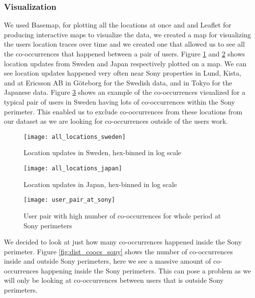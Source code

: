\subsubsection{Visualization}
We used Basemap\cite{basemap}, for plotting all the locations at once and and Leaflet\cite{leaflet} for producing interactive maps to visualize the data, we created a map for visualizing the users location traces over time and we created one that allowed us to see all the co-occurrences that happened between a pair of users. Figure \ref{fig:sweden_locations_hexbin} and \ref{fig:japan_locations_hexbin} shows location updates from Sweden and Japan respectively plotted on a map. We can see location updates happened very often near Sony properties in Lund\cite{sony_headquarters_sweden_lund}, Kista\cite{sony_headquarters_sweden_kista}, and at Ericsson AB in Göteborg\cite{ericsson} for the Swedish data, and in Tokyo\cite{sony_headquarters_japan} for the Japanese data. Figure \ref{fig:user_pair_at_sony} shows an example of the co-occurrences visualized for a typical pair of users in Sweden having lots of co-occurrences within the Sony perimeter. This enabled us to exclude co-occurrences from these locations from our dataset as we are looking for co-occurrences outside of the users work.
\begin{figure}[H]
    \hspace*{-1.0cm}
    \centering
    \texttt{[image: all\_locations\_sweden]}
    \caption{Location updates in Sweden, hex-binned in log scale}
    \label{fig:sweden_locations_hexbin}
\end{figure}
\begin{figure}[H]
    \hspace*{-1.0cm}
    \centering
    \texttt{[image: all\_locations\_japan]}
    \caption{Location updates in Japan, hex-binned in log scale}
    \label{fig:japan_locations_hexbin}
\end{figure}
\begin{figure}[H]
    \hspace*{-1.0cm}
    \centering
    \texttt{[image: user\_pair\_at\_sony]}
    \caption{User pair with high number of co-occurrences for whole period at Sony perimeters}
    \label{fig:user_pair_at_sony}
\end{figure}

We decided to look at just how many co-occurrences happened inside the Sony perimeter. Figure \ref{fig:dist_coocs_sony} shows the number of co-occurrences inside and outside Sony perimeters, here we see a massive amount of co-occurrences happening inside the Sony perimeters. This can pose a problem as we will only be looking at co-occurrences between users that is outside Sony perimeters.

